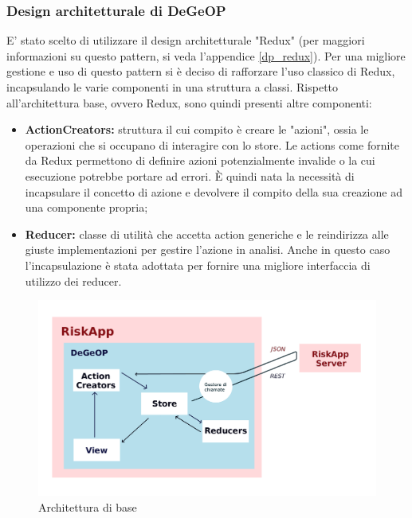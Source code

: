 \subsubsection{Design architetturale di DeGeOP}
E' stato scelto di utilizzare il design architetturale "Redux" (per maggiori informazioni su questo pattern, si veda l'appendice \ref{dp_redux}).
Per una migliore gestione e uso di questo pattern si è deciso di rafforzare l'uso classico di Redux, incapsulando le varie componenti in una struttura a classi.
Rispetto all'architettura base, ovvero Redux, sono quindi presenti altre componenti:
\begin{itemize}
	\item \textbf{ActionCreators:} struttura il cui compito è creare le "azioni", ossia le operazioni che si occupano di interagire con lo store. Le actions come fornite da Redux permettono di definire azioni potenzialmente invalide o la cui esecuzione potrebbe portare ad errori. È quindi nata la necessità di incapsulare il concetto di azione e devolvere il compito della sua creazione ad una componente propria;
	\item \textbf{Reducer:} classe di utilità che accetta action generiche e le reindirizza alle giuste implementazioni per gestire l'azione in analisi. Anche in questo caso l'incapsulazione è stata adottata per fornire una migliore interfaccia di utilizzo dei reducer.
\end{itemize}

\begin{figure}[H]
	\label{diagramma_architettura}
	\centering
	\includegraphics[width=\textwidth]{img/ArchitetturaBase.png}
	\caption{Architettura di base}
\end{figure}



